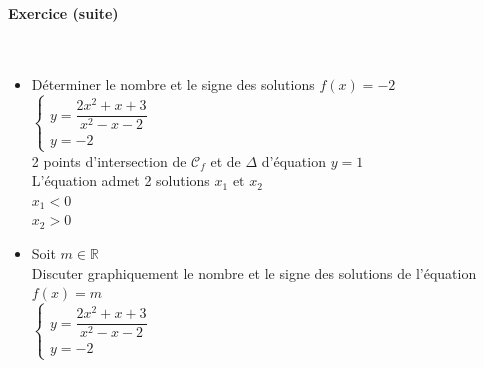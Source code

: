 \newpage



\paragraph{Exercice  (suite)}~\\

\begin{itemize}
    \item Déterminer le nombre et le signe des solutions $f(x) = -2$ \\
    $\begin{cases}
        y = \dfrac{2x^2 +x +3}{x^2 -x -2} \\
        y = -2
    \end{cases}$ \\
    
    2 points d'intersection de $\mathscr{C}_f$ et de $\Delta$ d'équation $y=1$ \\
    
    L'équation admet 2 solutions $x_1 \text{ et } x_2$ \\
    
    $x_1 < 0 $\\
    $x_2 > 0 $\\
  
    
    \item Soit $m \in \mathbb{R}$ \\
    
    Discuter graphiquement le nombre et le signe des solutions de l'équation $f(x) = m $\\
    
    $\begin{cases}
        y = \dfrac{2x^2 +x +3}{x^2 -x -2} \\
        y = -2
    \end{cases}$ \\
    

\bigskip


\end{itemize}
